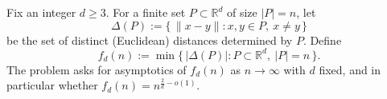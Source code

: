 Fix an integer \(d\ge 3\). For a finite set \(P\subset \mathbb{R}^d\) of size \(|P|=n\), let
\[
\Delta(P):=\{\,\|x-y\|: x,y\in P,\ x\ne y\,\}
\]
be the set of distinct (Euclidean) distances determined by \(P\). Define
\[
f_d(n):=\min\{\,|\Delta(P)|: P\subset\mathbb{R}^d,\ |P|=n\,\}.
\]
The problem asks for asymptotics of \(f_d(n)\) as \(n\to\infty\) with \(d\) fixed, and in particular whether
\(f_d(n)=n^{\frac{2}{d}-o(1)}\).
